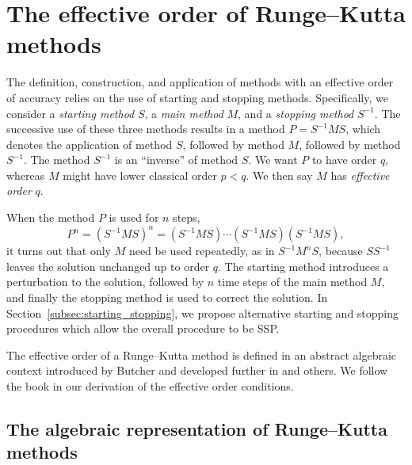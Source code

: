 \documentclass[final]{siamltex}  %
\begin{document}
\section{The effective order of Runge--Kutta methods}\label{sec:Algebraic_RK}
The definition, construction, and application of methods with an
effective order of accuracy relies on the use of starting and stopping
methods.
Specifically, we consider a \emph{starting method} $S$, a \emph{main
  method} $M$, and a \emph{stopping method} $S^{-1}$.
The successive use of these three methods results in a method $P =
S^{-1}MS$, which denotes the application of method $S$, followed by
method $M$, followed by method $S^{-1}$.
The method $S^{-1}$ is an ``inverse'' of method $S$.
We want $P$ to have order $q$, whereas $M$ might have lower classical
order $p < q$.
We then say $M$ has \emph{effective order} $q$.

When the method $P$ is used for $n$ steps,
$$P^n = (S^{-1}MS)^n = (S^{-1}MS) \cdots (S^{-1}MS) (S^{-1}MS),$$
it turns out that only $M$ need be used repeatedly, as in
$S^{-1} M^n S$,
because %
$S S^{-1}$ leaves the solution unchanged up to order $q$.
The starting method introduces a perturbation to the solution,
followed by $n$ time steps of the main method $M$, and finally the
stopping method is used to correct the solution.
In Section~\ref{subsec:starting_stopping}, we propose alternative
starting and stopping procedures which allow the overall procedure to
be SSP.

The effective order of a Runge--Kutta method is defined in an abstract 
algebraic context introduced by Butcher \cite{Butcher1969} and developed 
further in \cite{Butcher1972, Hairer1974, Butcher1996, Butcher1998} and 
others.
We follow the book \cite{Butcher2008_book} in our %
derivation of the effective order conditions.

\subsection{The algebraic representation of Runge--Kutta methods}\label{subsec:Algebraic_representation}
\end{document}
